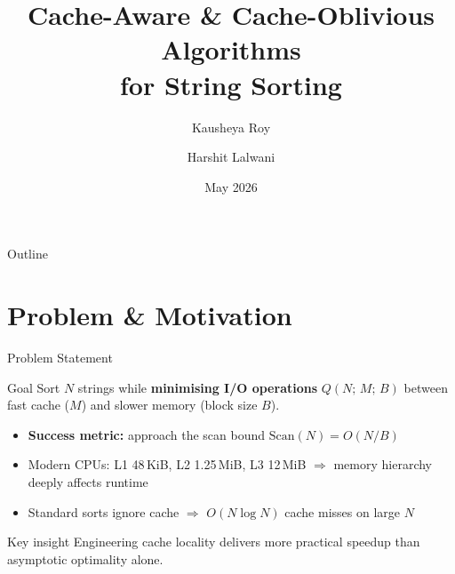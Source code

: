 \documentclass[aspectratio=169]{beamer}
\title[Cache-Efficient String Sorting]{
  Cache-Aware \& Cache-Oblivious Algorithms\\for String Sorting}
\author{Kausheya Roy \and Harshit Lalwani}
\institute{AlgoEngineering Project}
\date{May 2026}
\begin{document}
\begin{frame}
  \titlepage
\end{frame}

\begin{frame}{Outline}
  \tableofcontents
\end{frame}

\section{Problem \& Motivation}

\begin{frame}{Problem Statement}
  \begin{block}{Goal}
    Sort $N$ strings while \textbf{minimising I/O operations}
    $Q(N;\,M;\,B)$ between fast cache ($M$) and slower memory
    (block size $B$).
  \end{block}
  \vspace{0.5em}
  \begin{itemize}
    \item \textbf{Success metric:} approach the scan bound
          $\mathrm{Scan}(N) = O(N/B)$
    \item Modern CPUs: L1 48\,KiB, L2 1.25\,MiB, L3 12\,MiB
          $\Rightarrow$ memory hierarchy deeply affects runtime
    \item Standard sorts ignore cache $\Rightarrow$ $O(N \log N)$
          cache misses on large $N$
  \end{itemize}
  \vspace{0.5em}
  \begin{alertblock}{Key insight}
    Engineering cache locality delivers more practical speedup than
    asymptotic optimality alone.
  \end{alertblock}
\end{frame}
\end{document}
